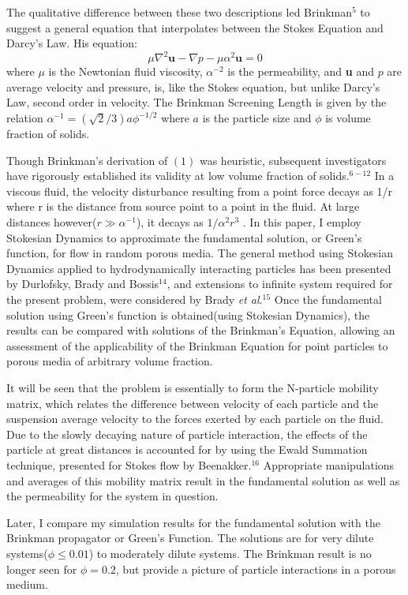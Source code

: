 \documentclass[12pt]{article}
\begin{document}
The qualitative difference between these two descriptions led Brinkman$^5$ to suggest a general equation that interpolates between the Stokes Equation and Darcy's Law. His equation: \begin{equation}
\mu\nabla^2\textbf{u}-\nabla p - \mu\alpha^2\textbf{u} = 0
\end{equation} 
where $\mu$ is the Newtonian fluid viscosity, $\alpha^{-2}$ is the permeability, and \textbf{u} and $p$ are average velocity and pressure, is, like the Stokes equation, but unlike Darcy's Law, second order in velocity. The Brinkman Screening Length is given by the relation $\alpha^{-1}=(\sqrt{2}/3)a\phi^{-1/2}$ where $a$ is the particle size and $\phi$ is volume fraction of solids.

Though Brinkman's derivation of $(1)$ was heuristic, subsequent investigators have rigorously established its validity at low volume fraction of solids.$^{6-12}$ In a viscous fluid, the velocity disturbance resulting from a point force decays as 1/r where r is the distance from source point to a point in the fluid. At large distances however($r\gg\alpha^{-1}$), it decays as $1/\alpha^{2}r^{3}$ . In this paper, I employ Stokesian Dynamics to approximate the fundamental solution, or Green's function, for flow in random porous media. The general method using Stokesian Dynamics applied to hydrodynamically interacting particles has been presented by Durlofsky, Brady and Bossis$^{14}$, and extensions to infinite system required for the present problem, were considered by Brady \textit{et al}.$^{15}$ Once the fundamental solution using Green's function is obtained(using Stokesian Dynamics), the results can be compared with solutions of the Brinkman's Equation, allowing an assessment of the applicability of the Brinkman Equation for point particles to porous media of arbitrary volume fraction. 

It will be seen that the problem is essentially to form the N-particle mobility matrix, which relates the difference between velocity of each particle and the suspension average velocity to the forces exerted by each particle on the fluid. Due to the slowly decaying nature of particle interaction, the effects of the particle at great distances is accounted for by using the Ewald Summation technique, presented for Stokes flow by Beenakker.$^{16}$ Appropriate manipulations and averages of this mobility matrix result in the fundamental solution as well as the permeability for the system in question.

Later, I compare my simulation results for the fundamental solution with the Brinkman propagator or Green's Function. The solutions are for very dilute systems($\phi\leq 0.01$) to moderately dilute systems. The Brinkman result is no longer seen for $\phi=0.2$, but provide a  picture of particle interactions in a porous medium. 
\end{document}
